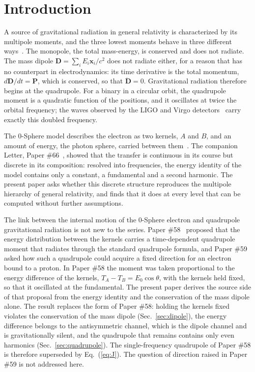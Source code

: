 \documentclass[%
 reprint, amsmath,amssymb, aps, prb, ]{revtex4-2}
\numberwithin{equation}{section}
\begin{document}
\maketitle

\section{Introduction}
\label{sec:intro}

A source of gravitational radiation in general relativity is characterized by its multipole moments, and the three lowest moments behave in three different ways~\cite{MTW,Maggiore}. The monopole, the total mass-energy, is conserved and does not radiate. The mass dipole $\bm{D} = \sum_i E_i\bm{x}_i/c^2$ does not radiate either, for a reason that has no counterpart in electrodynamics: its time derivative is the total momentum, $d\bm{D}/dt = \bm{P}$, which is conserved, so that $\ddot{\bm{D}} = 0$. Gravitational radiation therefore begins at the quadrupole. For a binary in a circular orbit, the quadrupole moment is a quadratic function of the positions, and it oscillates at twice the orbital frequency; the waves observed by the LIGO and Virgo detectors~\cite{LIGO2016} carry exactly this doubled frequency.

The 0-Sphere model describes the electron as two kernels, $A$ and $B$, and an amount of energy, the photon sphere, carried between them~\cite{H65,H51}. The companion Letter, Paper \#66~\cite{H66}, showed that the transfer is continuous in its course but discrete in its composition: resolved into frequencies, the energy identity of the model contains only a constant, a fundamental and a second harmonic. The present paper asks whether this discrete structure reproduces the multipole hierarchy of general relativity, and finds that it does at every level that can be computed without further assumptions.

The link between the internal motion of the 0-Sphere electron and quadrupole gravitational radiation is not new to the series. Paper \#58~\cite{H58} proposed that the energy distribution between the kernels carries a time-dependent quadrupole moment that radiates through the standard quadrupole formula, and Paper \#59~\cite{H59} asked how such a quadrupole could acquire a fixed direction for an electron bound to a proton. In Paper \#58 the moment was taken proportional to the energy difference of the kernels, $T_A - T_B = E_0\cos\theta$, with the kernels held fixed, so that it oscillated at the fundamental. The present paper derives the source side of that proposal from the energy identity and the conservation of the mass dipole alone. The result replaces the form of Paper \#58: holding the kernels fixed violates the conservation of the mass dipole (Sec.~\ref{sec:dipole}), the energy difference belongs to the antisymmetric channel, which is the dipole channel and is gravitationally silent, and the quadrupole that remains contains only even harmonics (Sec.~\ref{sec:quadrupole}). The single-frequency quadrupole of Paper \#58 is therefore superseded by Eq.~(\ref{eq:J}). The question of direction raised in Paper \#59 is not addressed here.
\end{document}
